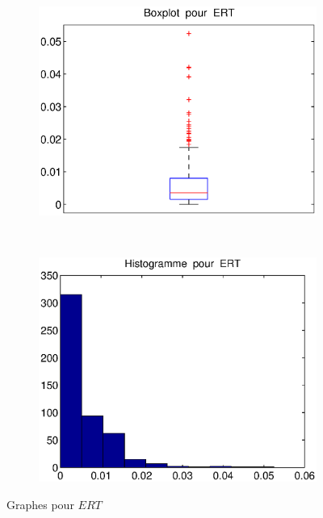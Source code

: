 \begin{figure}[!ht]
        \centering
        \begin{subfigure}[b]{0.5\textwidth}
                \includegraphics[width=\textwidth]{graphes/boxplot_ertmg.eps}
        \end{subfigure}%
        ~ 
        \begin{subfigure}[b]{0.5\textwidth}
                \includegraphics[width=\textwidth]{graphes/hist_ertmg.eps}
        \end{subfigure}
        \caption{Graphes pour $ERT$}\label{fig:ertmg}
\end{figure}

